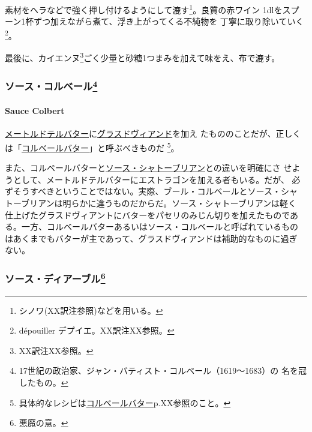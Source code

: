 素材をヘラなどで強く押し付けるようにして漉す\footnote{シノワ(XX訳注参照)などを用いる。}。良質の赤ワイン
1\undemi{}dlをスプーン1杯ずつ加えながら煮て、浮き上がってくる不純物を
丁寧に取り除いていく\footnote{dépouiller デプイエ。XX訳注XX参照。}。

最後に、カイエンヌ\footnote{XX訳注XX参照。}ごく少量と砂糖1つまみを加えて味をえ、布で漉す。

\maeaki

\hypertarget{ux30bdux30fcux30b9ux30b3ux30ebux30d9ux30fcux30eb23}{%
\subsubsection[ソース・コルベール]{\texorpdfstring{ソース・コルベール\footnote{17世紀の政治家、ジャン・バティスト・コルベール（1619〜1683）の
  名を冠したもの。}}{ソース・コルベール}}\label{ux30bdux30fcux30b9ux30b3ux30ebux30d9ux30fcux30eb23}}

\hypertarget{sauce-colbert}{%
\paragraph{Sauce Colbert}\label{sauce-colbert}}

  

\href{}{メートルドテルバター}に\protect\hyperlink{glace-de-viande}{グラスドヴィアンド}を加え
たもののことだが、正しくは「\href{}{コルベールバター}」と呼ぶべきものだ
\footnote{具体的なレシピは\href{}{コルベールバター}p.XX参照のこと。}。

また、コルベールバターと\href{}{ソース・シャトーブリアン}との違いを明確にさ
せようとして、メートルドテルバターにエストラゴンを加える者もいる。だが、
必ずそうすべきということではない。実際、ブール・コルベールとソース・シャ
トーブリアンは明らかに違うものだからだ。ソース・シャトーブリアンは軽く
仕上げたグラスドヴィアントにバターをパセリのみじん切りを加えたものであ
る。一方、コルベールバターあるいはソース・コルベールと呼ばれているもの
はあくまでもバターが主であって、グラスドヴィアンドは補助的なものに過ぎ
ない。

\maeaki

\hypertarget{ux30bdux30fcux30b9ux30c7ux30a3ux30a2ux30fcux30d6ux30eb25}{%
\subsubsection[ソース・ディアーブル]{\texorpdfstring{ソース・ディアーブル\footnote{悪魔の意。}}{ソース・ディアーブル}}\label{ux30bdux30fcux30b9ux30c7ux30a3ux30a2ux30fcux30d6ux30eb25}}

